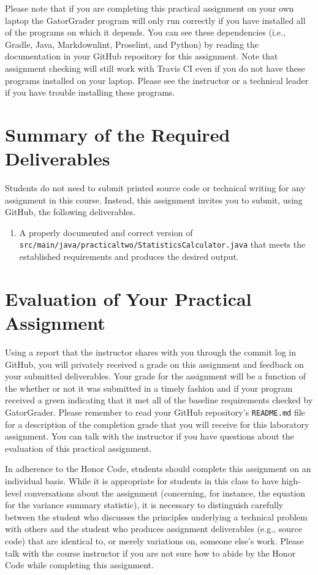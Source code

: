 \documentclass[11pt]{article}
\newcommand{\mainprogramsource}{\lstinline{src/main/java/practicaltwo/StatisticsCalculator.java}}
\newcommand{\program}[1]{\lstinline{#1}}
\newcommand{\checkmark}{\ding{51}}
\begin{document}
Please note that if you are completing this practical assignment on your own
laptop the GatorGrader program will only run correctly if you have installed
all of the programs on which it depends. You can see these dependencies (i.e.,
Gradle, Java, Markdownlint, Proselint, and Python) by reading the documentation
in your GitHub repository for this assignment. Note that assignment checking
will still work with Travis CI even if you do not have these programs installed
on your laptop. Please see the instructor or a technical leader if you have
trouble installing these programs.

\section*{Summary of the Required Deliverables}

\noindent Students do not need to submit printed source code or technical
writing for any assignment in this course. Instead, this assignment invites you
to submit, using GitHub, the following deliverables.

\vspace*{-.05in}
\begin{enumerate}

  \setlength{\itemsep}{0in}

\item A properly documented and correct version of \mainprogramsource{} that
  meets the established requirements and produces the desired output.

\end{enumerate}
\vspace*{-.1in}

\section*{Evaluation of Your Practical Assignment}

Using a report that the instructor shares with you through the commit log in
GitHub, you will privately received a grade on this assignment and feedback on
your submitted deliverables. Your grade for the assignment will be a function of
the whether or not it was submitted in a timely fashion and if your program
received a green \checkmark{} indicating that it met all of the baseline
requirements checked by GatorGrader.
%
Please remember to read your GitHub repository's \program{README.md} file for a
description of the completion grade that you will receive for this laboratory
assignment.
%
You can talk with the instructor if you have questions about the evaluation of
this practical assignment.

In adherence to the Honor Code, students should complete this assignment on an
individual basis. While it is appropriate for students in this class to have
high-level conversations about the assignment (concerning, for instance, the
equation for the variance summary statistic), it is necessary to distinguish
carefully between the student who discusses the principles underlying a
technical problem with others and the student who produces assignment
deliverables (e.g., source code) that are identical to, or merely variations on,
someone else's work. Please talk with the course instructor if you are not sure
how to abide by the Honor Code while completing this assignment.
\end{document}
